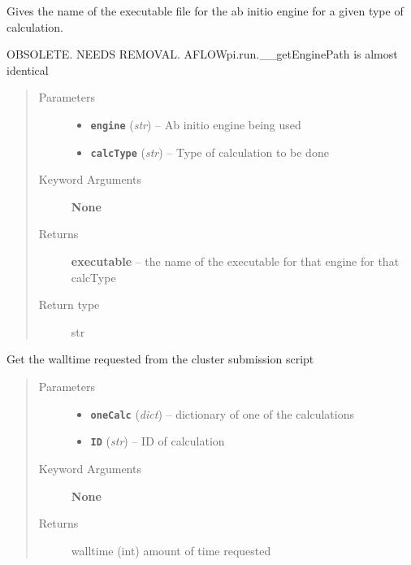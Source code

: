 \documentclass[letterpaper,10pt,english]{sphinxmanual}
\begin{document}
\begin{fulllineitems}
\label{run:run.__getExecutable}
Gives the name of the executable file for the ab initio engine
for a given type of calculation.

OBSOLETE. NEEDS REMOVAL. AFLOWpi.run.\_\_getEnginePath is almost identical
\begin{quote}\begin{description}
\item[{Parameters}] \leavevmode\begin{itemize}
\item {} 
\textbf{\texttt{engine}} (\emph{str}) -- Ab initio engine being used

\item {} 
\textbf{\texttt{calcType}} (\emph{str}) -- Type of calculation to be done

\end{itemize}

\item[{Keyword Arguments}] \leavevmode
\textbf{None}

\item[{Returns}] \leavevmode
\textbf{executable} --
the name of the executable for that engine for that calcType

\item[{Return type}] \leavevmode
str

\end{description}\end{quote}

\end{fulllineitems}


\begin{fulllineitems}
\label{run:run.__getWalltime}
Get the walltime requested from the cluster submission script
\begin{quote}\begin{description}
\item[{Parameters}] \leavevmode\begin{itemize}
\item {} 
\textbf{\texttt{oneCalc}} (\emph{dict}) -- dictionary of one of the calculations

\item {} 
\textbf{\texttt{ID}} (\emph{str}) -- ID of calculation

\end{itemize}

\item[{Keyword Arguments}] \leavevmode
\textbf{None}

\item[{Returns}] \leavevmode
walltime (int) amount of time requested

\end{description}\end{quote}

\end{fulllineitems}
\end{document}
